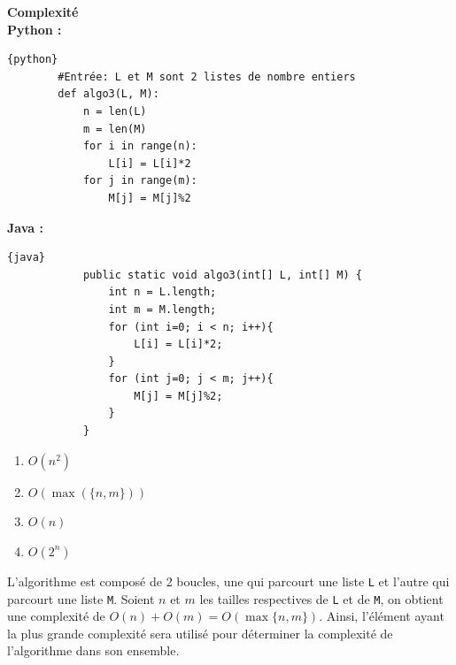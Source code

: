 \begin{Exercice}[10 minutes] \textbf{Complexité} \\

        \textbf{Python :}
        \begin{lstlisting}{python}
        #Entrée: L et M sont 2 listes de nombre entiers
        def algo3(L, M):
            n = len(L)
            m = len(M)
            for i in range(n):
                L[i] = L[i]*2
            for j in range(m):
                M[j] = M[j]%2
        \end{lstlisting}
        
        \textbf{Java :}
        \begin{lstlisting}{java}
            public static void algo3(int[] L, int[] M) {
                int n = L.length;
                int m = M.length;
                for (int i=0; i < n; i++){
                    L[i] = L[i]*2;
                }
                for (int j=0; j < m; j++){
                    M[j] = M[j]%2;
                }
            }
        \end{lstlisting}

        \begin{enumerate}
            \item $O(n^2)$
            \item $O(\max(\{n,m\}))$
            \item $O(n)$
            \item $O(2^n)$
        \end{enumerate}

        \begin{solution}
        L'algorithme est composé de 2 boucles, une qui parcourt une liste \lstinline{L} et l'autre qui parcourt une liste \lstinline{M}. Soient $n$ et $m$ les tailles respectives de \lstinline{L} et de \lstinline{M}, on obtient une complexité de $O(n) + O(m) = O(\max\{n,m\})$. 
        Ainsi, l'élément ayant la plus grande complexité sera utilisé pour déterminer la complexité de l'algorithme dans son ensemble.
        \end{solution}
\end{Exercice}


